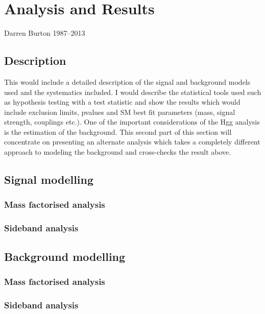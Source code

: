 \chapter{Analysis and Results}
\label{chap:results}
{Darren Burton 1987--2013}

\section{Description}

This would include a detailed description of the signal and background models used and the systematics included. I would describe the statistical tools used such as hypothesis testing with a test statistic and show the results which would include exclusion limits, pvalues and SM best fit parameters (mass, signal strength, couplings etc.). One of the important considerations of the Hgg analysis is the estimation of the background. This second part of this section will concentrate on presenting an alternate analysis which takes a completely different approach to modeling the background and cross-checks the result above.

\section{Signal modelling}
\label{sec:signal_model}

  \subsection{Mass factorised analysis}
  \subsection{Sideband analysis}

\section{Background modelling}
\label{sec:background_model}

  \subsection{Mass factorised analysis}
  \subsection{Sideband analysis}

